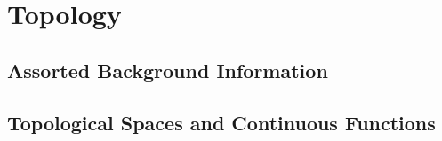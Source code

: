 \documentclass{report}
\begin{document}
\part{Topology}
\chapter{Assorted Background Information}
 
\chapter{Topological Spaces and Continuous Functions}
 
\end{document}
